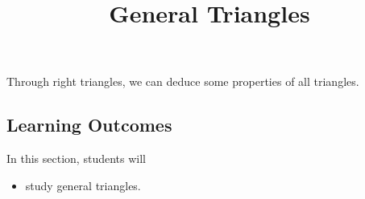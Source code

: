 \documentclass{ximera}
\title{General Triangles}
\begin{document}
\begin{abstract}
\end{abstract}
\maketitle




Through right triangles, we can deduce some properties of all triangles.











\subsection{Learning Outcomes}


\begin{sectionOutcomes}
In this section, students will 

\begin{itemize}
\item study general triangles.
\end{itemize}
\end{sectionOutcomes}
\end{document}
